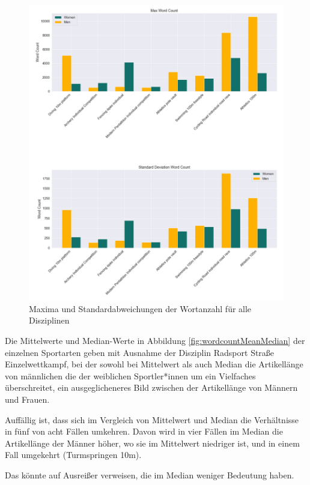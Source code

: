 \documentclass[11pt]{article}
\begin{document}
\begin{figure}
\includegraphics[width=1\textwidth]{figures/wordcount_max_std.png}
\caption[Maxima und Standardabweichungen der Wortanzahl für alle Disziplinen]{Maxima und Standardabweichungen der Wortanzahl für alle Disziplinen}
\label{fig:wordcountMaxStd}
\end{figure}

Die Mittelwerte und Median-Werte in Abbildung \ref{fig:wordcountMeanMedian} der einzelnen Sportarten geben mit Ausnahme der Disziplin Radsport Straße Einzelwettkampf, bei der sowohl bei Mittelwert als auch Median die Artikellänge von männlichen die der weiblichen Sportler*innen um ein Vielfaches überschreitet, ein ausgeglicheneres Bild zwischen der Artikellänge von Männern und Frauen.   

Auffällig ist, dass sich im Vergleich von Mittelwert und Median die Verhältnisse in fünf von acht Fällen umkehren. Davon wird in vier Fällen im Median die Artikellänge der Männer höher, wo sie im Mittelwert niedriger ist, und in einem Fall umgekehrt (Turmspringen 10m).

Das könnte auf Ausreißer verweisen, die im Median weniger Bedeutung haben.
\end{document}
